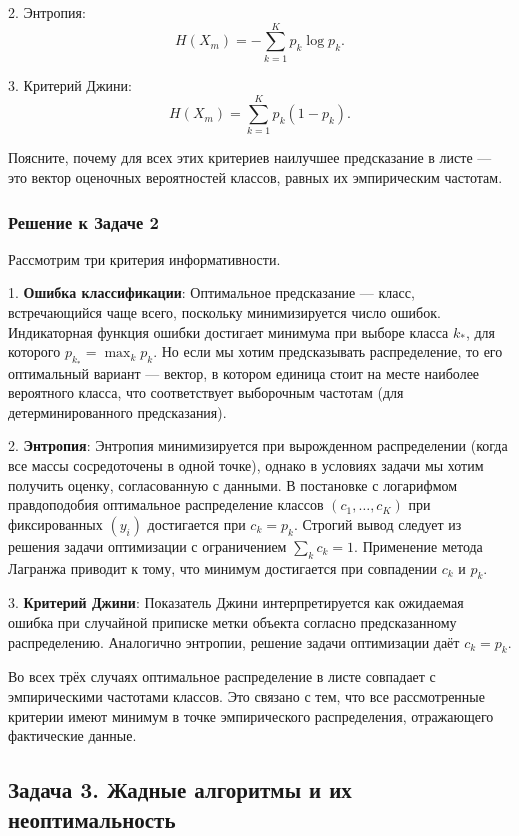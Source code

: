 2. Энтропия:
\[
H(X_m) = -\sum_{k=1}^K p_k \log p_k.
\]

3. Критерий Джини:
\[
H(X_m) = \sum_{k=1}^K p_k(1 - p_k).
\]

Поясните, почему для всех этих критериев наилучшее предсказание в листе — это вектор оценочных вероятностей классов, равных их эмпирическим частотам.

\subsubsection*{Решение к Задаче 2}

Рассмотрим три критерия информативности.

1. \textbf{Ошибка классификации}: 
Оптимальное предсказание — класс, встречающийся чаще всего, поскольку минимизируется число ошибок. Индикаторная функция ошибки достигает минимума при выборе класса \(k_*\), для которого \(p_{k_*} = \max_k p_k\). Но если мы хотим предсказывать распределение, то его оптимальный вариант — вектор, в котором единица стоит на месте наиболее вероятного класса, что соответствует выборочным частотам (для детерминированного предсказания).

2. \textbf{Энтропия}:
Энтропия минимизируется при вырожденном распределении (когда все массы сосредоточены в одной точке), однако в условиях задачи мы хотим получить оценку, согласованную с данными. В постановке с логарифмом правдоподобия оптимальное распределение классов \((c_1,\ldots,c_K)\) при фиксированных \((y_i)\) достигается при \(c_k = p_k\). Строгий вывод следует из решения задачи оптимизации с ограничением \(\sum_k c_k = 1\). Применение метода Лагранжа приводит к тому, что минимум достигается при совпадении \(c_k\) и \(p_k\).

3. \textbf{Критерий Джини}:
Показатель Джини интерпретируется как ожидаемая ошибка при случайной приписке метки объекта согласно предсказанному распределению. Аналогично энтропии, решение задачи оптимизации даёт \(c_k = p_k\).

Во всех трёх случаях оптимальное распределение в листе совпадает с эмпирическими частотами классов. Это связано с тем, что все рассмотренные критерии имеют минимум в точке эмпирического распределения, отражающего фактические данные.


\subsection*{Задача 3. Жадные алгоритмы и их неоптимальность}

